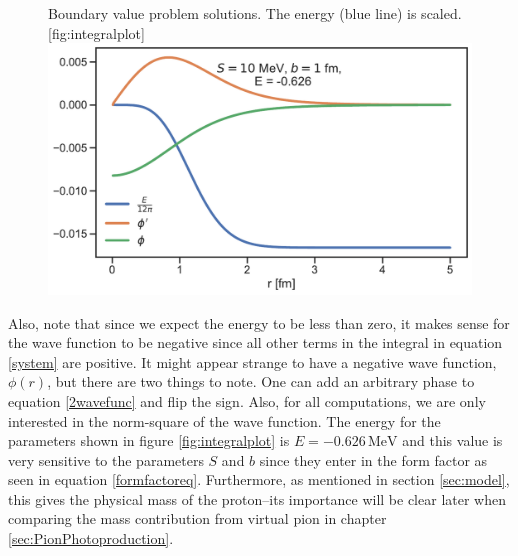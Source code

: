 \begin{figure}[H]
	\begin{sidecaption}{Boundary value problem solutions. The energy (blue line) is scaled.}[fig:integralplot]
		\includegraphics[width=\linewidth]{Figures/Integralplot.pdf}
	\end{sidecaption}
\end{figure}
Also, note that since we expect the energy to be less than zero, it makes sense for the wave function to be negative since all other terms in the integral in equation \eqref{system} are positive. It might appear strange to have a negative wave function, $\phi(r)$, but there are two things to note. One can add an arbitrary phase to equation \eqref{2wavefunc} and flip the sign. Also, for all computations, we are only interested in the norm-square of the wave function. The energy for the parameters shown in figure \ref{fig:integralplot} is $E = -0.626 \, \text{MeV}$ and this value is very sensitive to the parameters $S$ and $b$ since they enter in the form factor as seen in equation \eqref{formfactoreq}. Furthermore, as mentioned in section \ref{sec:model}, this gives the physical mass of the proton--its importance will be clear later when comparing the mass contribution from virtual pion in chapter \ref{sec:PionPhotoproduction}.

